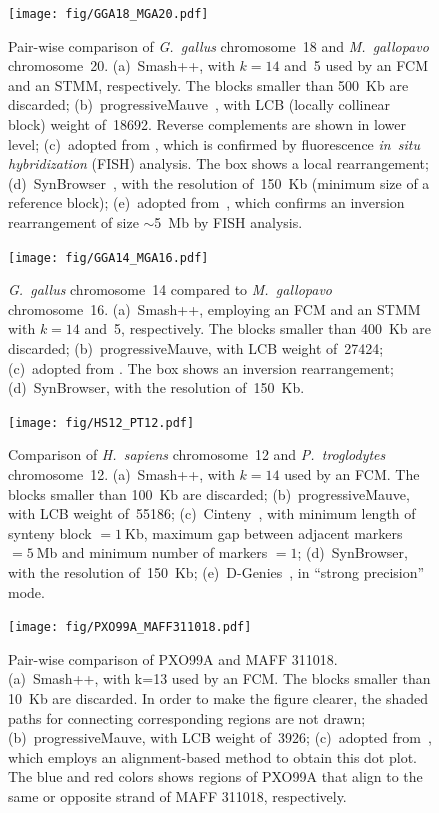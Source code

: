 \documentclass[a4paper,9pt]{extarticle}
\begin{document}
\begin{figure}[!h]
  \centering
  \texttt{[image: fig/GGA18\_MGA20.pdf]}
  \caption{Pair-wise comparison of \textit{G.~gallus} chromosome~18 and \textit{M.~gallopavo} chromosome~20.
  (a)~Smash++, with $k=14$ and~5 used by an FCM and an STMM, respectively. The blocks smaller than 500~Kb are discarded;
  (b)~progressiveMauve~\cite{darling2010progressivemauve}, with LCB (locally collinear block) weight of~18692. Reverse complements are shown in lower level;
  (c)~adopted from \cite{zhang2011comparative}, which is confirmed by fluorescence \textit{in~situ hybridization} (FISH) analysis. The box shows a local rearrangement;
  (d)~SynBrowser~\cite{lee2016synteny}, with the resolution of~150~Kb (minimum size of a reference block);
  (e)~adopted from~\cite{dalloul2010multi}, which confirms an inversion rearrangement of size $\sim$5~Mb by FISH analysis.}
  \label{fig.supp.GGA18.MGA20}
\end{figure}

\begin{figure}[p]
  \centering
  \texttt{[image: fig/GGA14\_MGA16.pdf]}
  \caption{\textit{G.~gallus} chromosome~14 compared to \textit{M.~gallopavo} chromosome~16.
  (a)~Smash++, employing an FCM and an STMM with $k=14$ and~5, respectively. The blocks smaller than 400~Kb are discarded;
  (b)~progressiveMauve, with LCB weight of~27424;
  (c)~adopted from \cite{zhang2011comparative}. The box shows an inversion rearrangement; 
  (d)~SynBrowser, with the resolution of~150~Kb.}
  \label{fig.supp.GGA14.MGA16}
\end{figure}

\begin{figure}[p]
  \centering
  \texttt{[image: fig/HS12\_PT12.pdf]}
  \caption{Comparison of \textit{H.~sapiens} chromosome~12 and \textit{P.~troglodytes} chromosome~12.
  (a)~Smash++, with $k=14$ used by an FCM. The blocks smaller than 100~Kb are discarded;
  (b)~progressiveMauve, with LCB weight of~55186;
  (c)~Cinteny~\cite{sinha2007cinteny}, with minimum length of synteny block $=1~$Kb, maximum gap between adjacent markers $=5~$Mb and minimum number of markers $=1$;
  (d)~SynBrowser, with the resolution of~150~Kb;
  (e)~D-Genies~\cite{cabanettes2018d}, in ``strong precision'' mode.}
  \label{fig.supp.HS12.PT12}
\end{figure}

\begin{figure}[p]
  \centering
  \texttt{[image: fig/PXO99A\_MAFF311018.pdf]}
  \caption{Pair-wise comparison of PXO99A and MAFF 311018.
  (a)~Smash++, with k=13 used by an FCM. The blocks smaller than 10~Kb are discarded. In order to make the figure clearer, the shaded paths for connecting corresponding regions are not drawn;
  (b)~progressiveMauve, with LCB weight of~3926;
  (c)~adopted from~\cite{salzberg2008genome}, which employs an alignment-based method to obtain this dot plot. The blue and red colors shows regions of PXO99A that align to the same or opposite strand of MAFF 311018, respectively.}
  \label{fig.supp.PXO99A.MAFF_311018}
\end{figure}
\end{document}

